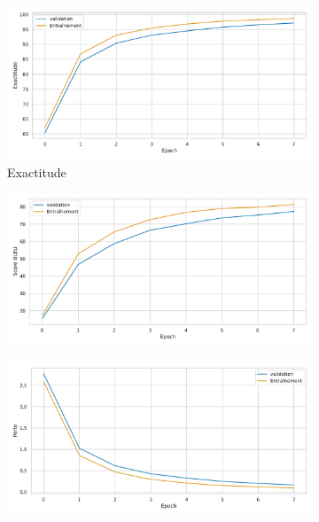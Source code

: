 \begin{figure}[hbt]
    \begin{subfigure}{.5\textwidth}
        \caption{Exactitude}
        \begin{center}
            \includegraphics[width=\textwidth]{assets/python/accuracy.pdf}
        \end{center}
        \label{fig.results.training.accuracy}
    \end{subfigure}
    \begin{subfigure}{.5\textwidth}
        \caption{}
        \begin{center}
            \includegraphics[width=\textwidth]{assets/python/bleu.pdf}
        \end{center}
        \label{fig.results.training.bleu}
    \end{subfigure}
    \begin{subfigure}{.5\textwidth}
        \begin{center}
            \includegraphics[width=\textwidth]{assets/python/loss.pdf}

\end{center}
\end{subfigure}
\end{figure}
